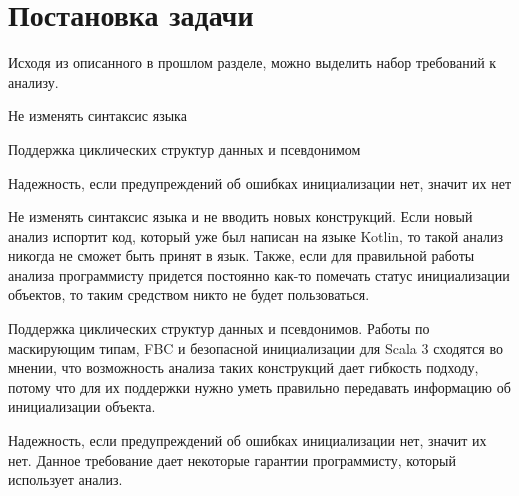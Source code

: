 \chapter{Постановка задачи}\label{ch:постановка-задачи}


Исходя из описанного в прошлом разделе, можно выделить набор требований к анализу.
\begin{itemize*}
    \item Не изменять синтаксис языка
    \item Поддержка циклических структур данных и псевдонимом
    \item Надежность, если предупреждений об ошибках инициализации нет, значит их нет
\end{itemize*}

Не изменять синтаксис языка и не вводить новых конструкций.
Если новый анализ испортит код, который уже был написан на языке Kotlin, то такой анализ никогда не сможет быть принят в язык.
Также, если для правильной работы анализа программисту придется постоянно как-то помечать статус инициализации объектов,
то таким средством никто не будет пользоваться.

Поддержка циклических структур данных и псевдонимов.
Работы по маскирующим типам, FBC и безопасной инициализации для Scala 3 сходятся во мнении,
что возможность анализа таких конструкций дает гибкость подходу,
потому что для их поддержки нужно уметь правильно передавать информацию об инициализации объекта.

Надежность, если предупреждений об ошибках инициализации нет, значит их нет.
Данное требование дает некоторые гарантии программисту, который использует анализ.


